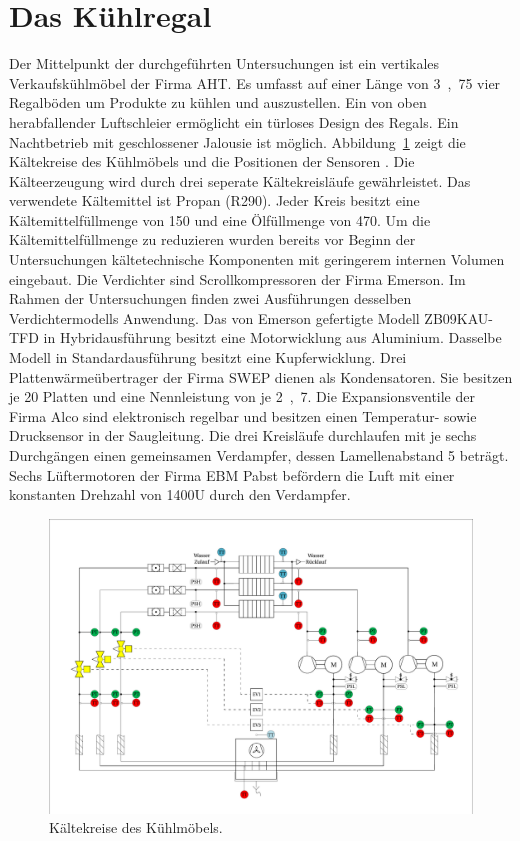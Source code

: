 \section{Das Kühlregal}
\label{sec:Das Kühlregal}

Der Mittelpunkt der durchgeführten Untersuchungen ist ein vertikales Verkaufskühlmöbel der Firma AHT.
Es umfasst auf einer Länge von \unit{3,75}{\metre} vier Regalböden um Produkte zu kühlen und auszustellen. Ein von oben herabfallender Luftschleier ermöglicht ein türloses Design des Regals. Ein Nachtbetrieb mit geschlossener Jalousie ist möglich. Abbildung~\ref{fig:IDC150} zeigt die Kältekreise des Kühlmöbels und die Positionen der Sensoren \cite{DINDeutschesInstitutfurNormunge.V..1998}. Die Kälteerzeugung wird durch drei seperate Kältekreisläufe gewährleistet. Das verwendete Kältemittel ist Propan (R290). Jeder Kreis besitzt eine Kältemittelfüllmenge von \unit{150}{\gram} und eine Ölfüllmenge von \unit{470}{\gram}. Um die Kältemittelfüllmenge zu reduzieren wurden bereits vor Beginn der Untersuchungen kältetechnische Komponenten mit geringerem internen Volumen eingebaut. Die Verdichter sind Scrollkompressoren der Firma Emerson.  Im Rahmen der Untersuchungen finden zwei Ausführungen desselben Verdichtermodells Anwendung. Das von Emerson gefertigte Modell ZB09KAU-TFD in Hybridausführung besitzt eine Motorwicklung aus Aluminium. Dasselbe Modell in Standardausführung besitzt eine Kupferwicklung. Drei Plattenwärmeübertrager der Firma SWEP dienen als Kondensatoren. Sie besitzen je 20 Platten und eine Nennleistung von je \unit{2,7}{\kilo\watt}. Die Expansionsventile der Firma Alco sind elektronisch regelbar und besitzen einen Temperatur- sowie Drucksensor in der Saugleitung. Die drei Kreisläufe durchlaufen mit je sechs Durchgängen einen gemeinsamen Verdampfer, dessen Lamellenabstand \unit{5}{\milli\metre} beträgt. Sechs Lüftermotoren der Firma EBM Pabst befördern die Luft mit einer konstanten Drehzahl von \unit{1400}{U\per\min} durch den Verdampfer.

\begin{figure} %
\centering
\includegraphics[scale=.56,angle=90]{Pictures/IDC150.pdf}
\caption{Kältekreise des Kühlmöbels.}
\label{fig:IDC150}
\end{figure}


